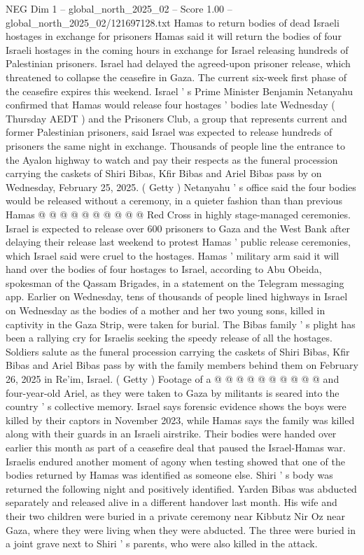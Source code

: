 \begin{textsample}{NEG Dim 1 – global\_north\_2025\_02 – Score 1.00 – global\_north\_2025\_02/121697128.txt}  \label{ex:f1_neg_020}
Hamas to return bodies of dead Israeli hostages in exchange for prisoners Hamas said it will return the bodies of four Israeli hostages in the coming hours in exchange for Israel releasing hundreds of Palestinian prisoners.
Israel had delayed the agreed-upon prisoner release, which threatened to collapse the ceasefire in Gaza.
The current six-week first phase of the ceasefire expires this weekend.
Israel ' s Prime Minister Benjamin Netanyahu confirmed that Hamas would release four hostages ' bodies late Wednesday ( Thursday AEDT ) and the Prisoners Club, a group that represents current and former Palestinian prisoners, said Israel was expected to release hundreds of prisoners the same night in exchange.
Thousands of people line the entrance to the Ayalon highway to watch and pay their respects as the funeral procession carrying the caskets of Shiri Bibas, Kfir Bibas and Ariel Bibas pass by on Wednesday, February 25, 2025. ( Getty ) Netanyahu ' s office said the four bodies would be released without a ceremony, in a quieter fashion than than previous Hamas @ @ @ @ @ @ @ @ @ @ Red Cross in highly stage-managed ceremonies.
Israel is expected to release over 600 prisoners to Gaza and the West Bank after delaying their release last weekend to protest Hamas ' public release ceremonies, which Israel said were cruel to the hostages.
Hamas ' military arm said it will hand over the bodies of four hostages to Israel, according to Abu Obeida, spokesman of the Qassam Brigades, in a statement on the Telegram messaging app.
Earlier on Wednesday, tens of thousands of people lined highways in Israel on Wednesday as the bodies of a mother and her two young sons, killed in captivity in the Gaza Strip, were taken for burial.
The Bibas family ' s plight has been a rallying cry for Israelis seeking the speedy release of all the hostages.
Soldiers salute as the funeral procession carrying the caskets of Shiri Bibas, Kfir Bibas and Ariel Bibas pass by with the family members behind them on February 26, 2025 in Re'im, Israel. ( Getty ) Footage of a @ @ @ @ @ @ @ @ @ @ and four-year-old Ariel, as they were taken to Gaza by militants is seared into the country ' s collective memory.
Israel says forensic evidence shows the boys were killed by their captors in November 2023, while Hamas says the family was killed along with their guards in an Israeli airstrike.
Their bodies were handed over earlier this month as part of a ceasefire deal that paused the Israel-Hamas war.
Israelis endured another moment of agony when testing showed that one of the bodies returned by Hamas was identified as someone else.
Shiri ' s body was returned the following night and positively identified.
Yarden Bibas was abducted separately and released alive in a different handover last month.
His wife and their two children were buried in a private ceremony near Kibbutz Nir Oz near Gaza, where they were living when they were abducted.
The three were buried in a joint grave next to Shiri ' s parents, who were also killed in the attack.

\end{textsample}
